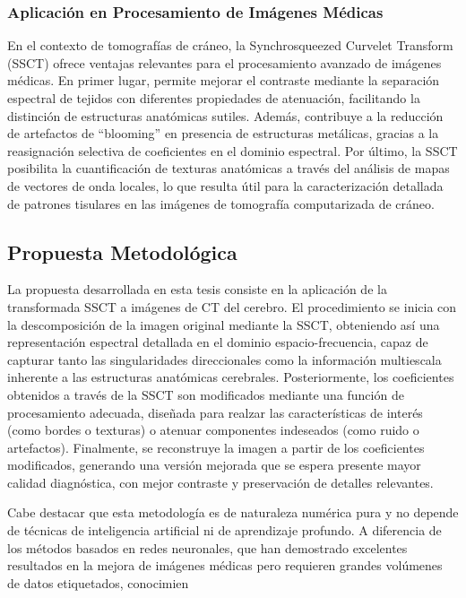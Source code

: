 \subsubsection{Aplicación en Procesamiento de Imágenes Médicas}

En el contexto de tomografías de cráneo, la Synchrosqueezed Curvelet Transform (SSCT) ofrece ventajas relevantes para el procesamiento avanzado de imágenes médicas. En primer lugar, permite mejorar el contraste mediante la separación espectral de tejidos con diferentes propiedades de atenuación, facilitando la distinción de estructuras anatómicas sutiles. Además, contribuye a la reducción de artefactos de ``blooming'' en presencia de estructuras metálicas, gracias a la reasignación selectiva de coeficientes en el dominio espectral. Por último, la SSCT posibilita la cuantificación de texturas anatómicas a través del análisis de mapas de vectores de onda locales, lo que resulta útil para la caracterización detallada de patrones tisulares en las imágenes de tomografía computarizada de cráneo.

\subsection{Propuesta Metodológica}

La propuesta desarrollada en esta tesis consiste en la aplicación de la transformada SSCT a imágenes de CT del cerebro. El procedimiento se inicia con la descomposición de la imagen original mediante la SSCT, obteniendo así una representación espectral detallada en el dominio espacio-frecuencia, capaz de capturar tanto las singularidades direccionales como la información multiescala inherente a las estructuras anatómicas cerebrales. Posteriormente, los coeficientes obtenidos a través de la SSCT son modificados mediante una función de procesamiento adecuada, diseñada para realzar las características de interés (como bordes o texturas) o atenuar componentes indeseados (como ruido o artefactos). Finalmente, se reconstruye la imagen a partir de los coeficientes modificados, generando una versión mejorada que se espera presente mayor calidad diagnóstica, con mejor contraste y preservación de detalles relevantes.

Cabe destacar que esta metodología es de naturaleza numérica pura y no depende de técnicas de inteligencia artificial ni de aprendizaje profundo. A diferencia de los métodos basados en redes neuronales, que han demostrado excelentes resultados en la mejora de imágenes médicas pero requieren grandes volúmenes de datos etiquetados, conocimien

